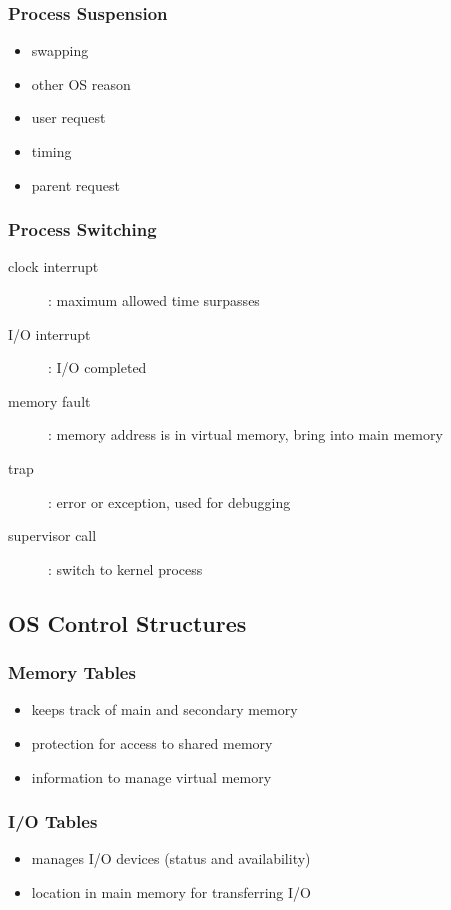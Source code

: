 \documentclass[]{article}
\theoremstyle{definition}
\begin{document}
			\subsubsection{Process Suspension}
				\begin{itemize}
					\item swapping
					\item other OS reason
					\item user request
					\item timing
					\item parent request
				\end{itemize}
			\subsubsection{Process Switching}
				\begin{description}
					\item[clock interrupt]: maximum allowed time surpasses
					\item[I/O interrupt]: I/O completed					
					\item[memory fault]: memory address is in virtual memory, bring into main memory
					\item[trap]: error or exception, used for debugging
					\item[supervisor call]: switch to kernel process
				\end{description}
					
		\subsection{OS Control Structures}
			\subsubsection{Memory Tables}
				\begin{itemize}
					\item keeps track of main and secondary memory
					\item protection for access to shared memory
					\item information to manage virtual memory
				\end{itemize}
			\subsubsection{I/O Tables}
				\begin{itemize}
					\item manages I/O devices (status and availability)
					\item location in main memory for transferring I/O
				\end{itemize}
\end{document}
